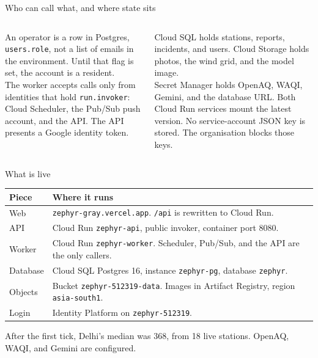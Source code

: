 \documentclass[t,aspectratio=169]{beamer}
\begin{document}
\begin{frame}[c]{Who can call what, and where state sits}
  \begin{columns}[T,totalwidth=\textwidth]
    \begin{column}{0.48\textwidth}
      \begin{eqcard}{4.55cm}
        An operator is a row in Postgres, \texttt{users.role}, not a list of emails in the environment. Until that flag is set, the account is a resident.\\[0.4em]
        The worker accepts calls only from identities that hold \texttt{run.invoker}: Cloud Scheduler, the Pub/Sub push account, and the API. The API presents a Google identity token.
      \end{eqcard}
    \end{column}
    \hfill
    \begin{column}{0.48\textwidth}
      \begin{eqcard}{4.55cm}
        Cloud SQL holds stations, reports, incidents, and users. Cloud Storage holds photos, the wind grid, and the model image.\\[0.4em]
        Secret Manager holds OpenAQ, WAQI, Gemini, and the database URL. Both Cloud Run services mount the latest version. No service-account JSON key is stored. The organisation blocks those keys.
      \end{eqcard}
    \end{column}
  \end{columns}
\end{frame}

\begin{frame}[c]{What is live}
  \footnotesize
  \renewcommand{\arraystretch}{1.16}
  \begin{tabularx}{\textwidth}{@{}H Y@{}}
    \toprule
    \textcolor{nlNavy}{\textbf{Piece}} & \textbf{Where it runs} \\
    \midrule
    Web & \mbox{\texttt{zephyr-gray.vercel.app}}. \texttt{/api} is rewritten to Cloud Run. \\
    API & Cloud Run \texttt{zephyr-api}, public invoker, container port 8080. \\
    Worker & Cloud Run \texttt{zephyr-worker}. Scheduler, Pub/Sub, and the API are the only callers. \\
    Database & Cloud SQL Postgres 16, instance \texttt{zephyr-pg}, database \texttt{zephyr}. \\
    Objects & Bucket \mbox{\texttt{zephyr-512319-data}}. Images in Artifact Registry, region \mbox{\texttt{asia-south1}}. \\
    Login & Identity Platform on \texttt{zephyr-512319}. \\
    \bottomrule
  \end{tabularx}
  \vspace{0.28cm}
  {\footnotesize After the first tick, Delhi's median was 368, from 18 live stations. OpenAQ, WAQI, and Gemini are configured.}
\end{frame}
\end{document}
